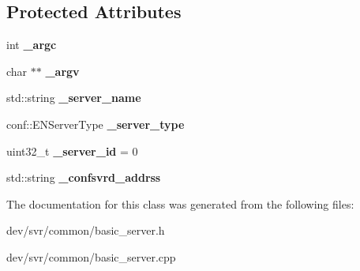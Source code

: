 \subsection*{Protected Attributes}
\begin{DoxyCompactItemize}
\item 
\hypertarget{classBasicServer_afb545bed9b10ee6dcf0eeeff8fce779b}{
int {\bfseries \_\-argc}}
\label{classBasicServer_afb545bed9b10ee6dcf0eeeff8fce779b}

\item 
\hypertarget{classBasicServer_a829dcf89b3625fd41322f7559b5cc41e}{
char $\ast$$\ast$ {\bfseries \_\-argv}}
\label{classBasicServer_a829dcf89b3625fd41322f7559b5cc41e}

\item 
\hypertarget{classBasicServer_ac98f7144fa2210bb2d5611153affa747}{
std::string {\bfseries \_\-server\_\-name}}
\label{classBasicServer_ac98f7144fa2210bb2d5611153affa747}

\item 
\hypertarget{classBasicServer_a3d571011ad66510892fa72c32121fe26}{
conf::ENServerType {\bfseries \_\-server\_\-type}}
\label{classBasicServer_a3d571011ad66510892fa72c32121fe26}

\item 
\hypertarget{classBasicServer_ae0e1c63eb6a0b3e19cc6a9e0cc381aa2}{
uint32\_\-t {\bfseries \_\-server\_\-id} = 0}
\label{classBasicServer_ae0e1c63eb6a0b3e19cc6a9e0cc381aa2}

\item 
\hypertarget{classBasicServer_a6cb24bf1bcce1fde219bc59ae33e6cc2}{
std::string {\bfseries \_\-confsvrd\_\-addrss}}
\label{classBasicServer_a6cb24bf1bcce1fde219bc59ae33e6cc2}

\end{DoxyCompactItemize}


The documentation for this class was generated from the following files:\begin{DoxyCompactItemize}
\item 
dev/svr/common/basic\_\-server.h\item 
dev/svr/common/basic\_\-server.cpp\end{DoxyCompactItemize}
